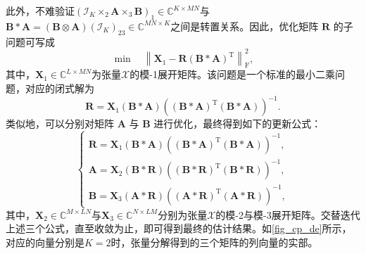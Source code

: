 此外，不难验证\( (\mathcal{I}_K \times_2 \mathbf{A} \times_3 \mathbf{B})_1 \in \mathbb{C}^{K \times M N} \)与\( \mathbf{B} \ast  \mathbf{A} = (\mathbf{B} \otimes \mathbf{A}) (\mathcal{I}_K)_{23} \in \mathbb{C}^{M N \times K} \)之间是转置关系。因此，优化矩阵 \( \mathbf{R} \) 的子问题可写成
\[
    \min \quad \left\| \mathbf{X}_{1} - \mathbf{R} (\mathbf{B} \ast  \mathbf{A})^{\mathrm{T}} \right\|_{\mathrm{F}}^2,
\]
其中，\( \mathbf{X}_{1} \in \mathbb{C}^{L \times M N} \)为张量\( \mathcal{X} \)的模-1展开矩阵。该问题是一个标准的最小二乘问题，对应的闭式解为
\[
    \mathbf{R} = \mathbf{X}_{1} (\mathbf{B} \ast  \mathbf{A}) \left( (\mathbf{B} \ast  \mathbf{A})^{\mathrm{T}} (\mathbf{B} \ast  \mathbf{A}) \right)^{-1}.
\]
类似地，可以分别对矩阵 \( \mathbf{A} \) 与 \( \mathbf{B} \) 进行优化，最终得到如下的更新公式：
\[
    \begin{cases}
        \mathbf{R} = \mathbf{X}_{1} (\mathbf{B} \ast  \mathbf{A}) \left( (\mathbf{B} \ast  \mathbf{A})^{\mathrm{T}} (\mathbf{B} \ast  \mathbf{A}) \right)^{-1}, \\
        \mathbf{A} = \mathbf{X}_{2} (\mathbf{B} \ast \mathbf{R}) \left( (\mathbf{B} \ast \mathbf{R})^{\mathrm{T}} (\mathbf{B} \ast  \mathbf{R}) \right)^{-1},   \\
        \mathbf{B} = \mathbf{X}_{3} (\mathbf{A} \ast  \mathbf{R}) \left( (\mathbf{A} \ast  \mathbf{R})^{\mathrm{T}} (\mathbf{A} \ast  \mathbf{R}) \right)^{-1},
    \end{cases}
\]
其中，\( \mathbf{X}_{2} \in \mathbb{C}^{M \times L N} \)与\( \mathbf{X}_{3} \in \mathbb{C}^{N \times L M} \)分别为张量\( \mathcal{X} \)的模-2与模-3展开矩阵。交替迭代上述三个公式，直至收敛为止，即可得到最终的估计结果。如\cref{fig_cp_de}所示，对应的向量分别是\( K=2 \)时，张量分解得到的三个矩阵的列向量的实部。
